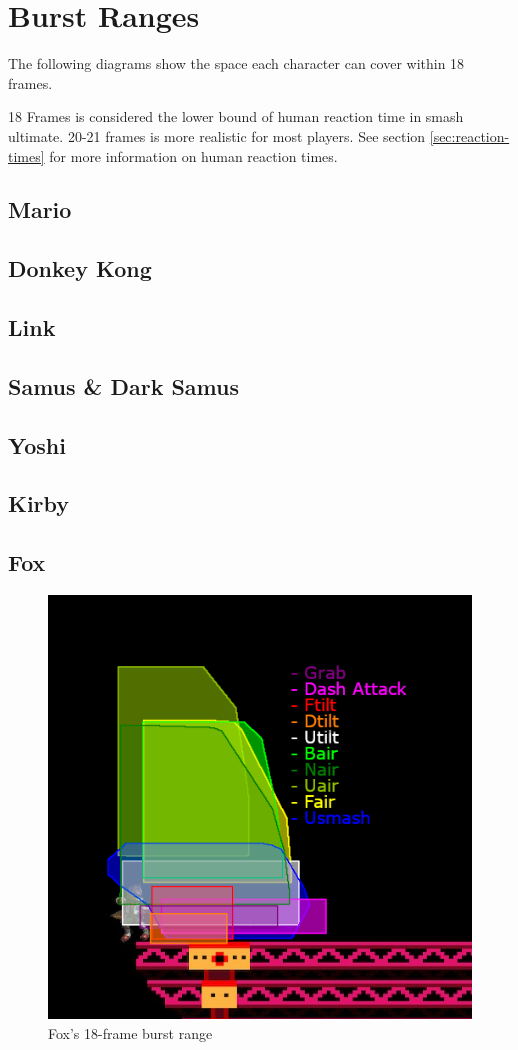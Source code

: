 \section{Burst Ranges}

The following diagrams show the space each character can cover within 18 frames.

18 Frames is considered the lower bound of human reaction time in smash ultimate. 20-21 frames is more realistic for most players. See section \ref{sec:reaction-times} for more information on human reaction times.

\begin{multicols}{2}

\subsection{Mario}
\subsection{Donkey Kong}
\subsection{Link}
\subsection{Samus \& Dark Samus}
\subsection{Yoshi}
\subsection{Kirby}
\subsection{Fox}
\begin{figure}[H]
    \centering
    \includegraphics[width=.45\textwidth]{images/burst-ranges/fox}
    \caption{Fox's 18-frame burst range\cite{ref:burst-range:fox}}
\end{figure}


\end{multicols}
